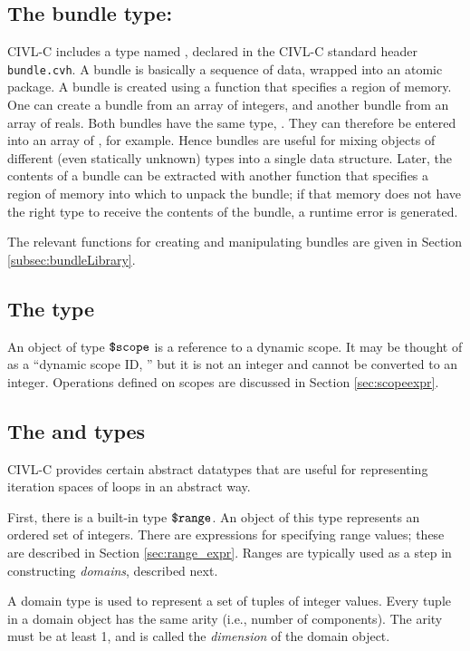 \subsection{The bundle type: \cbundle}

CIVL-C includes a type named \cbundle, declared in the CIVL-C standard header \texttt{bundle.cvh}. A bundle is basically a
sequence of data, wrapped into an atomic package. A bundle is created
using a function that specifies a region of memory. One can create a
bundle from an array of integers, and another bundle from an array of
reals. Both bundles have the same type, \cbundle. They can therefore
be entered into an array of \cbundle, for example. Hence bundles are
useful for mixing objects of different (even statically unknown) types
into a single data structure. Later, the contents of a bundle can be
extracted with another function that specifies a region of memory into
which to unpack the bundle; if that memory does not have the right
type to receive the contents of the bundle, a runtime error is
generated.

The relevant functions for creating and manipulating bundles
are given in Section \ref{subsec:bundleLibrary}.

\subsection{The \cscope{} type}
\label{sec:scopetype}

An object of type $\mbox{\texttt{\${}scope}}$ is a reference to a dynamic scope.  It may
be thought of as a ``dynamic scope ID, '' but it is not an integer and
cannot be converted to an integer.  Operations defined on scopes are
discussed in Section \ref{sec:scopeexpr}.

\subsection{The \crange{} and \cdomain{} types}

CIVL-C provides certain abstract datatypes that are useful for
representing iteration spaces of loops in an abstract way.

First, there is a built-in type $\mbox{\texttt{\${}range}}$.  An object of this type
represents an ordered set of integers.  There are expressions for
specifying range values; these are described in Section
\ref{sec:range_expr}.   Ranges are typically used as a step
in constructing \emph{domains}, described next.

A domain type is used to represent a set of tuples of integer values.
Every tuple in a domain object has the same arity (i.e., number of
components).  The arity must be at least 1, and is called the
\emph{dimension} of the domain object.

